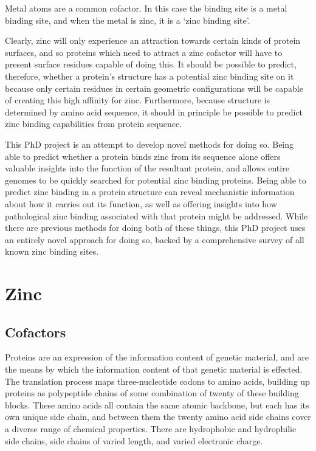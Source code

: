 Metal atoms are a common cofactor. In this case the binding site is a metal binding site, and when the metal is zinc, it is a `zinc binding site'.

Clearly, zinc will only experience an attraction towards certain kinds of protein surfaces, and so proteins which need to attract a zinc cofactor will have to present surface residues capable of doing this. It should be possible to predict, therefore, whether a protein's structure has a potential zinc binding site on it because only certain residues in certain geometric configurations will be capable of creating this high affinity for zinc. Furthermore, because structure is determined by amino acid sequence, it should in principle be possible to predict zinc binding capabilities from protein sequence.

This PhD project is an attempt to develop novel methods for doing so. Being able to predict whether a protein binds zinc from its sequence alone offers valuable insights into the function of the resultant protein, and allows entire genomes to be quickly searched for potential zinc binding proteins. Being able to predict zinc binding in a protein structure can reveal mechanistic information about how it carries out its function, as well as offering insights into how pathological zinc binding associated with that protein might be addressed. While there are previous methods for doing both of these things, this PhD project uses an entirely novel approach for doing so, backed by a comprehensive survey of all known zinc binding sites.

\section{Zinc}

\subsection{Cofactors}

Proteins are an expression of the information content of genetic material, and are the means by which the information content of that genetic material is effected. The translation process maps three-nucleotide codons to amino acids, building up proteins as polypeptide chains of some combination of twenty of these building blocks. These amino acids all contain the same atomic backbone, but each has its own unique side chain, and between them the twenty amino acid side chains cover a diverse range of chemical properties. There are hydrophobic and hydrophilic side chains, side chains of varied length, and varied electronic charge.

